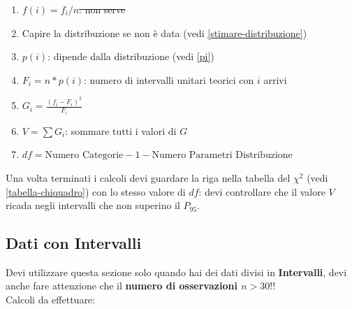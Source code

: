 \begin{enumerate}
\begin{enumerate}
                  \item \st{$f(i) = f_i / n$: non serve}
                  \item Capire la distribuzione se non è data (vedi
                        \ref{stimare-distribuzione})
                  \item $p(i)$: dipende dalla distribuzione (vedi \ref{pi})
                  \item $F_i = n * p(i)$: numero di intervalli unitari teorici
                        con $i$ arrivi
                  \item $G_i = \frac{(f_i - F_i)^2}{F_i}$
                  \item $V = \sum G_i$: sommare tutti i valori di $G$
                  \item $df = \text{Numero Categorie} - 1 - \text{Numero
                                    Parametri Distribuzione}$
            \end{enumerate}
\end{enumerate}

Una volta terminati i calcoli devi guardare la riga nella tabella del $\chi^2$
(vedi \ref{tabella-chiquadro}) con lo stesso valore di $df$: devi controllare che il valore
$V$ ricada negli intervalli che non superino il $P_{95}$.

\subsection{Dati con Intervalli}

Devi utilizzare questa sezione solo quando hai dei dati divisi in
\textbf{Intervalli}, devi anche fare attenzione che il \textbf{numero di
      osservazioni $n > 30$}!!\\

Calcoli da effettuare:

